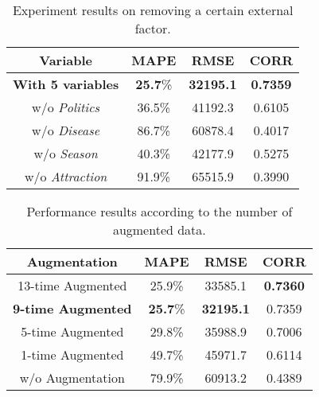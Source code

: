 \documentclass[conference]{IEEEtran}
\begin{document}
\begin{table}[t]
\centering
\caption{Experiment results on removing a certain external factor.}
\begin{tabular}[t]{c|c|c|c}
\hline
Variable&MAPE&RMSE&CORR\\
\hline
\textbf{With 5 variables}&\textbf{25.7}\%&\textbf{32195.1}&\textbf{0.7359}\\

w/o \textit{Politics}&36.5\%&41192.3&0.6105\\

w/o \textit{Disease}&86.7\%&60878.4&0.4017\\

w/o \textit{Season}&40.3\%&42177.9&0.5275\\

w/o \textit{Attraction}&91.9\%&65515.9&0.3990\\

\end{tabular}
\label{table:tb5}
\end{table}


\begin{table}[t]
\centering
\caption{Performance results according to the number of augmented data.}
\begin{tabular}[t]{c|c|c|c}
\hline
Augmentation&MAPE&RMSE&CORR\\
\hline
13-time Augmented&25.9\%&33585.1&\textbf{0.7360}\\

\textbf{9-time Augmented}&\textbf{25.7}\%&\textbf{32195.1}&0.7359\\

5-time Augmented&29.8\%&35988.9&0.7006\\

1-time Augmented&49.7\%&45971.7&0.6114\\

w/o Augmentation&79.9\%&60913.2&0.4389\\

\end{tabular}
\label{table:tb6}
\end{table}
\end{document}
